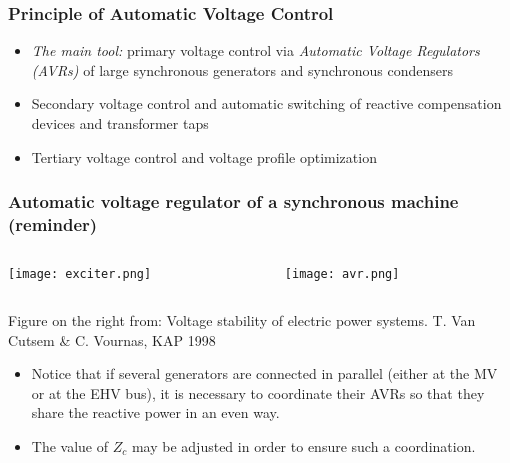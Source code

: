 \begin{frame}
    \frametitle{Principle of Automatic Voltage Control}
    \begin{itemize}
        \item \textit{The main tool:} primary voltage control via \textit{Automatic Voltage Regulators (AVRs)} of large synchronous generators and synchronous condensers
        \item Secondary voltage control and automatic switching of reactive compensation devices and transformer taps
        \item Tertiary voltage control and voltage profile optimization
    \end{itemize}
\end{frame}

\begin{frame}
    \frametitle{Automatic voltage regulator of a synchronous machine (reminder)}
    \begin{columns}
        \begin{column}{0.35\textwidth}
            \texttt{[image: exciter.png]}
        \end{column}
        \begin{column}{0.6\textwidth}
            \texttt{[image: avr.png]}
        \end{column}
    \end{columns}
    \tiny{Figure on the right from: Voltage stability of electric power systems. T. Van Cutsem \& C. Vournas, KAP 1998}
    \begin{itemize}
        \item Notice that if several generators are connected in parallel (either at the MV or at the EHV bus), it is necessary to coordinate their AVRs so that they share the reactive power in an even way.
        \item The value of $Z_c$ may be adjusted in order to ensure such a coordination.
    \end{itemize}
\end{frame}

